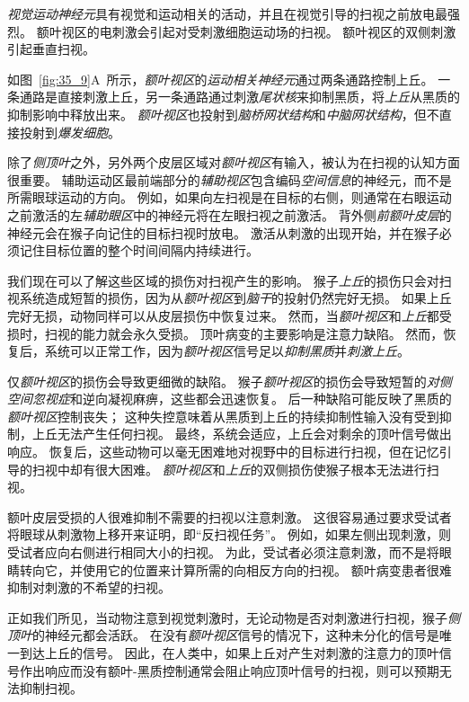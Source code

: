 \textit{视觉运动神经元}具有视觉和运动相关的活动，并且在视觉引导的扫视之前放电最强烈。
额叶视区的电刺激会引起对受刺激细胞运动场的扫视。
额叶视区的双侧刺激引起垂直扫视。


如图~\ref{fig:35_9}A~所示，\textit{额叶视区}的\textit{运动相关神经元}通过两条通路控制上丘。
一条通路是直接刺激上丘，另一条通路通过刺激\textit{尾状核}来抑制黑质，将\textit{上丘}从黑质的抑制影响中释放出来。
\textit{额叶视区}也投射到\textit{脑桥网状结构}和\textit{中脑网状结构}，但不直接投射到\textit{爆发细胞}。


除了\textit{侧顶叶}之外，另外两个皮层区域对\textit{额叶视区}有输入，被认为在扫视的认知方面很重要。
辅助运动区最前端部分的\textit{辅助视区}包含编码\textit{空间信息}的神经元，而不是所需眼球运动的方向。
例如，如果向左扫视是在目标的右侧，则通常在右眼运动之前激活的左\textit{辅助眼区}中的神经元将在左眼扫视之前激活。
背外侧\textit{前额叶皮层}的神经元会在猴子向记住的目标扫视时放电。
激活从刺激的出现开始，并在猴子必须记住目标位置的整个时间间隔内持续进行。


我们现在可以了解这些区域的损伤对扫视产生的影响。
猴子\textit{上丘}的损伤只会对扫视系统造成短暂的损伤，因为从\textit{额叶视区}到\textit{脑干}的投射仍然完好无损。
如果上丘完好无损，动物同样可以从皮层损伤中恢复过来。
然而，当\textit{额叶视区}和\textit{上丘}都受损时，扫视的能力就会永久受损。
顶叶病变的主要影响是注意力缺陷。
然而，恢复后，系统可以正常工作，因为\textit{额叶视区}信号足以\textit{抑制黑质}并\textit{刺激上丘}。


仅\textit{额叶视区}的损伤会导致更细微的缺陷。
猴子\textit{额叶视区}的损伤会导致短暂的\textit{对侧空间忽视症}和逆向凝视麻痹，这些都会迅速恢复。
后一种缺陷可能反映了黑质的\textit{额叶视区}控制丧失；
这种失控意味着从黑质到上丘的持续抑制性输入没有受到抑制，上丘无法产生任何扫视。
最终，系统会适应，上丘会对剩余的顶叶信号做出响应。
恢复后，这些动物可以毫无困难地对视野中的目标进行扫视，但在记忆引导的扫视中却有很大困难。
\textit{额叶视区}和\textit{上丘}的双侧损伤使猴子根本无法进行扫视。


额叶皮层受损的人很难抑制不需要的扫视以注意刺激。
这很容易通过要求受试者将眼球从刺激物上移开来证明，即“反扫视任务”。
例如，如果左侧出现刺激，则受试者应向右侧进行相同大小的扫视。
为此，受试者必须注意刺激，而不是将眼睛转向它，并使用它的位置来计算所需的向相反方向的扫视。
额叶病变患者很难抑制对刺激的不希望的扫视。


正如我们所见，当动物注意到视觉刺激时，无论动物是否对刺激进行扫视，猴子\textit{侧顶叶}的神经元都会活跃。
在没有\textit{额叶视区}信号的情况下，这种未分化的信号是唯一到达上丘的信号。
因此，在人类中，如果上丘对产生对刺激的注意力的顶叶信号作出响应而没有额叶-黑质控制通常会阻止响应顶叶信号的扫视，则可以预期无法抑制扫视。



